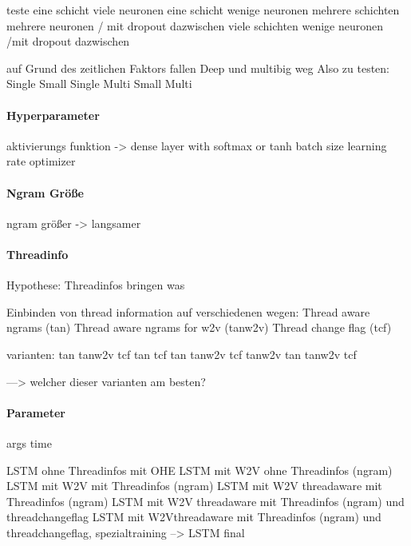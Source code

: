             teste eine schicht viele neuronen 
            eine schicht wenige neuronen
            mehrere schichten mehrere neuronen / mit dropout dazwischen
            viele schichten wenige neuronen /mit dropout dazwischen

            auf Grund des zeitlichen Faktors fallen Deep und multibig weg
            Also zu testen:
            Single Small
            Single 
            Multi Small
            Multi 

        \paragraph{Hyperparameter}
            aktivierungs funktion
            -> dense layer with softmax or tanh
            batch size
            learning rate
            optimizer

        \paragraph{Ngram Größe}
            ngram größer -> langsamer

        \paragraph{Threadinfo}
            Hypothese:
            Threadinfos bringen was

            Einbinden von thread information auf verschiedenen wegen:
            Thread aware ngrams (tan)
            Thread aware ngrams for w2v (tanw2v)
            Thread change flag (tcf)

            varianten:
            tan
            tanw2v
            tcf
            tan tcf
            tan tanw2v
            tcf tanw2v
            tan tanw2v tcf

            ---> welcher dieser varianten am besten?

        \paragraph{Parameter}
            args
            time

            LSTM ohne Threadinfos mit OHE
            LSTM mit W2V ohne Threadinfos (ngram)
            LSTM mit W2V mit Threadinfos (ngram)
            LSTM mit W2V threadaware mit Threadinfos (ngram)
            LSTM mit W2V threadaware mit Threadinfos (ngram) und threadchangeflag
            LSTM mit W2Vthreadaware mit Threadinfos (ngram) und threadchangeflag, spezialtraining
            --> LSTM final

